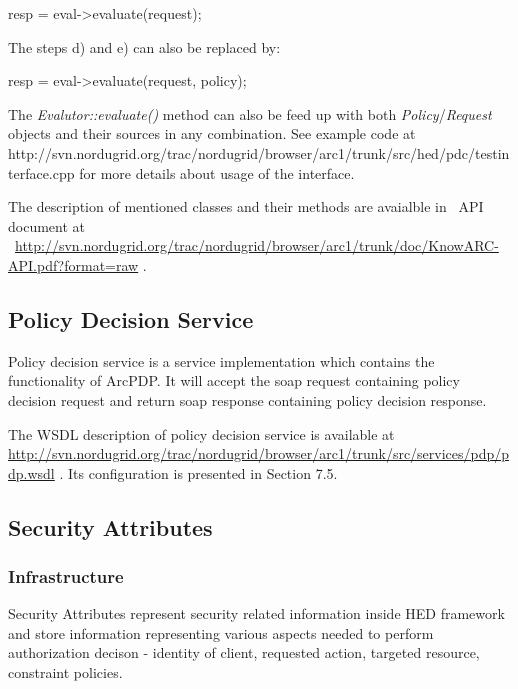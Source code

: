 \documentclass{article}
\begin{document}
{\ttfamily\color{black}
resp = eval-{\textgreater}evaluate(request);}

{\color{black}
The steps d) and e) can also be replaced by:}

{\ttfamily\color{black}
resp = eval-{\textgreater}evaluate(request, policy);}


\bigskip

{\upshape\color{black}
The \textit{Evalutor::evaluate()} method can also be feed up with both
\textit{Policy}/\textit{Request} objects and their sources in any
combination. See example code at
http://svn.nordugrid.org/trac/nordugrid/browser/arc1/trunk/src/hed/pdc/testinterface.cpp
for more details about usage of the interface.}

{\upshape\color{black}
The description of mentioned classes and their methods are avaialble in
\ API document at
\ \url{http://svn.nordugrid.org/trac/nordugrid/browser/arc1/trunk/doc/KnowARC-API.pdf?format=raw}
.}

\subsection{Policy Decision Service}
{\upshape\color{black}
Policy decision service is a service implementation which contains the
functionality of ArcPDP. It will accept the soap request containing
policy decision request and return soap response containing policy
decision response.}

{\upshape\color{black}
The WSDL description of policy decision service is available at
\url{http://svn.nordugrid.org/trac/nordugrid/browser/arc1/trunk/src/services/pdp/pdp.wsdl}
. It{\textquotesingle}s configuration is presented in Section 7.5. }

\subsection{Security Attributes}
\subsubsection[Infrastructure]{Infrastructure}
\label{bkm:Ref204009818}{\upshape\color{black}
Security Attributes represent security related information inside HED
framework and store information representing various aspects needed to
perform authorization decison - identity of client, requested action,
targeted resource, constraint policies. }
\end{document}
